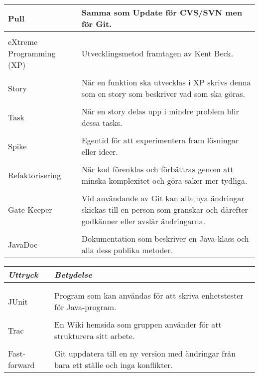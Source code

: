 \begin{table}
\begin{tabular}{ | l |  p{7cm} |}
\\Pull	 & Samma som Update för CVS/SVN men för Git. \\ \hline
\\eXtreme Programming (XP) &	Utvecklingsmetod framtagen av Kent Beck. \\ \hline
\\Story &	När en funktion ska utvecklas i XP skrivs denna som en story som beskriver vad som ska göras. \\ \hline
\\Task	& När en story delas upp i mindre problem blir dessa tasks. \\ \hline
\\Spike &	Egentid för att experimentera fram lösningar eller ideer. \\ \hline
\\Refaktorisering &	När kod förenklas och förbättras genom att minska komplexitet och göra saker mer tydliga. \\ \hline
\\Gate Keeper &	Vid användande av Git kan alla nya ändringar skickas till en person som granskar och därefter godkänner eller avslår ändringarna.  \\ \hline
\\JavaDoc &	Dokumentation som beskriver en Java-klass och alla dess publika metoder. \\ \hline
\end{tabular}
\end{table}




\begin{table}

\begin{tabular}{ | l |  p{10cm} |}
\hline
\emph{Uttryck}	 & \emph{Betydelse} \\ \hline \hline \\


\\JUnit	& Program som kan användas för att skriva enhetstester för Java-program. \\ \hline
\\Trac	& En Wiki hemsida som gruppen använder för att strukturera sitt arbete. \\ \hline
\\Fast-forward & Git uppdatera till en ny version med ändringar från bara ett ställe och inga konflikter. \\ \hline

\end{tabular}
\end{table}
